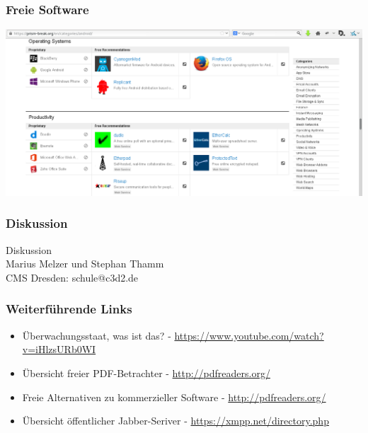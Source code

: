 \documentclass[12pt]{beamer}
\begin{document}
\begin{frame}
    \frametitle{Freie Software}
    \includegraphics[height=0.7\textheight]{img/prism-break2.png}
\end{frame}

\begin{frame}
    \frametitle{Diskussion}
    \begin{center} {\Large Diskussion}\\Marius Melzer und Stephan Thamm\\CMS Dresden: schule@c3d2.de \end{center}
\end{frame}

\begin{frame}
    \frametitle{Weiterführende Links}
    \begin{itemize}
        \item Überwachungsstaat, was ist das? - \url{https://www.youtube.com/watch?v=iHlzsURb0WI}
        \item Übersicht freier PDF-Betrachter - \url{http://pdfreaders.org/}
        \item Freie Alternativen zu kommerzieller Software - \url{http://pdfreaders.org/}
        \item Übersicht öffentlicher Jabber-Seriver - \url{https://xmpp.net/directory.php}
    \end{itemize}
\end{frame}
\end{document}
